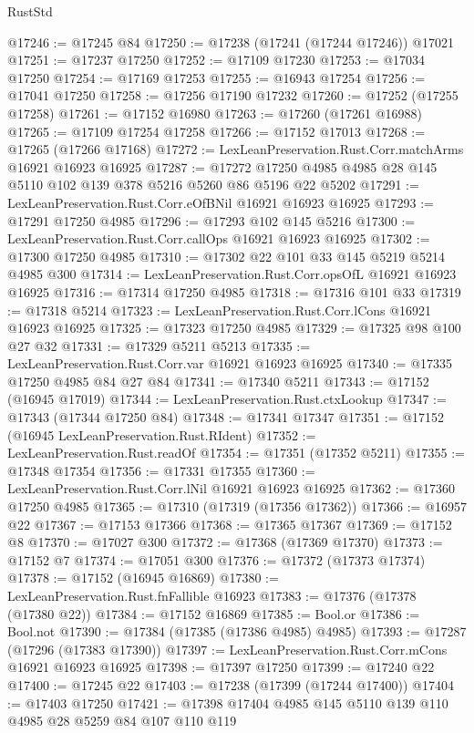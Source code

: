 \begin{lexlean}{RustStd}
\begin{coremodule}
@17246 := @17245 @84
@17250 := @17238 (@17241 (@17244 @17246)) @17021
@17251 := @17237 @17250
@17252 := @17109 @17230
@17253 := @17034 @17250
@17254 := @17169 @17253
@17255 := @16943 @17254
@17256 := @17041 @17250
@17258 := @17256 @17190 @17232
@17260 := @17252 (@17255 @17258)
@17261 := @17152 @16980
@17263 := @17260 (@17261 @16988)
@17265 := @17109 @17254 @17258
@17266 := @17152 @17013
@17268 := @17265 (@17266 @17168)
@17272 := LexLeanPreservation.Rust.Corr.matchArms @16921 @16923 @16925
@17287 := @17272 @17250 @4985 @4985 @28 @145 @5110 @102 @139 @378 @5216 @5260 @86 @5196 @22 @5202
@17291 := LexLeanPreservation.Rust.Corr.eOfBNil @16921 @16923 @16925
@17293 := @17291 @17250 @4985
@17296 := @17293 @102 @145 @5216
@17300 := LexLeanPreservation.Rust.Corr.callOps @16921 @16923 @16925
@17302 := @17300 @17250 @4985
@17310 := @17302 @22 @101 @33 @145 @5219 @5214 @4985 @300
@17314 := LexLeanPreservation.Rust.Corr.opsOfL @16921 @16923 @16925
@17316 := @17314 @17250 @4985
@17318 := @17316 @101 @33
@17319 := @17318 @5214
@17323 := LexLeanPreservation.Rust.Corr.lCons @16921 @16923 @16925
@17325 := @17323 @17250 @4985
@17329 := @17325 @98 @100 @27 @32
@17331 := @17329 @5211 @5213
@17335 := LexLeanPreservation.Rust.Corr.var @16921 @16923 @16925
@17340 := @17335 @17250 @4985 @84 @27 @84
@17341 := @17340 @5211
@17343 := @17152 (@16945 @17019)
@17344 := LexLeanPreservation.Rust.ctxLookup
@17347 := @17343 (@17344 @17250 @84)
@17348 := @17341 @17347
@17351 := @17152 (@16945 LexLeanPreservation.Rust.RIdent)
@17352 := LexLeanPreservation.Rust.readOf
@17354 := @17351 (@17352 @5211)
@17355 := @17348 @17354
@17356 := @17331 @17355
@17360 := LexLeanPreservation.Rust.Corr.lNil @16921 @16923 @16925
@17362 := @17360 @17250 @4985
@17365 := @17310 (@17319 (@17356 @17362))
@17366 := @16957 @22
@17367 := @17153 @17366
@17368 := @17365 @17367
@17369 := @17152 @8
@17370 := @17027 @300
@17372 := @17368 (@17369 @17370)
@17373 := @17152 @7
@17374 := @17051 @300
@17376 := @17372 (@17373 @17374)
@17378 := @17152 (@16945 @16869)
@17380 := LexLeanPreservation.Rust.fnFallible @16923
@17383 := @17376 (@17378 (@17380 @22))
@17384 := @17152 @16869
@17385 := Bool.or
@17386 := Bool.not
@17390 := @17384 (@17385 (@17386 @4985) @4985)
@17393 := @17287 (@17296 (@17383 @17390))
@17397 := LexLeanPreservation.Rust.Corr.mCons @16921 @16923 @16925
@17398 := @17397 @17250
@17399 := @17240 @22
@17400 := @17245 @22
@17403 := @17238 (@17399 (@17244 @17400))
@17404 := @17403 @17250
@17421 := @17398
    @17404
    @4985
    @145
    @5110
    @139
    @110
    @4985
    @28
    @5259
    @84
    @107
    @110
    @119

\end{coremodule}
\end{lexlean}
